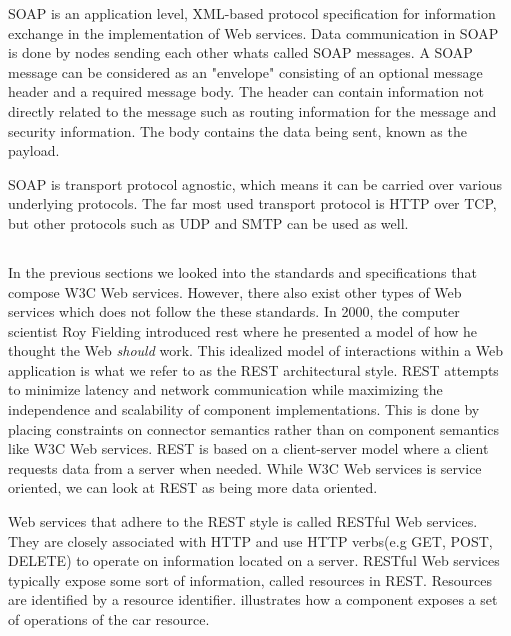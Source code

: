 SOAP is an application level, XML-based protocol specification for information
exchange\cite{w3c-soap} in the implementation of Web services. Data
communication in SOAP is done by nodes sending each other whats called SOAP
messages. A SOAP message can be considered as an "envelope" consisting of an
optional message header and a required message body. The header can contain
information not directly related to the message such as routing information for
the message and security information. The body contains the data being sent,
known as the payload.

SOAP is transport protocol agnostic, which means it can be carried over various
underlying protocols. The far most used transport protocol is HTTP over TCP, but
other protocols such as UDP and SMTP can be used as well.

\subsection{}
\label{rest}

In the previous sections we looked into the standards and specifications that
compose W3C Web services. However, there also exist other types of Web services
which does not follow the these standards. In 2000, the computer scientist Roy
Fielding introduced \gls{rest} where he presented a model of how he thought the
Web \textit{should} work. This idealized model of interactions within a Web
application\cite{rest-fielding} is what we refer to as the REST architectural
style. REST attempts to minimize latency and network communication while
maximizing the independence and scalability of component implementations. This
is done by placing constraints on connector semantics rather than on component
semantics like W3C Web services.  REST is based on a client-server model where a
client requests data from a server when needed. While W3C Web services is
service oriented, we can look at REST as being more data oriented.

Web services that adhere to the REST style is called RESTful Web services. They
are closely associated with HTTP and use HTTP verbs(e.g GET, POST, DELETE) to
operate on information located on a server. RESTful Web services typically
expose some sort of information, called resources in REST. Resources are
identified by a resource identifier.  illustrates how a
component exposes a set of operations of the car resource.

